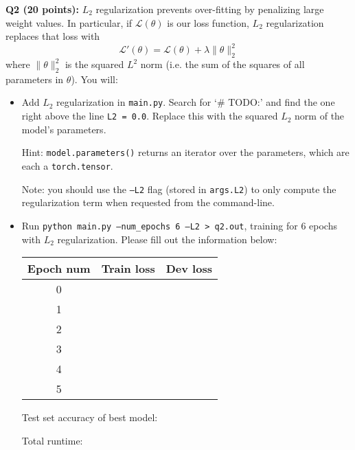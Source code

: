 \documentclass[11pt]{article}
\begin{document}
\vspace{0.4 in}
\noindent
{\bf Q2 (20 points):} $L_2$ regularization prevents over-fitting by penalizing large weight values.  In particular, if $\mathcal{L}(\theta)$ is our loss function, $L_2$ regularization replaces that loss with
\[ \mathcal{L}'(\theta) = \mathcal{L}(\theta) + \lambda \| \theta \|_2^2 \]
where $\|\theta\|_2^2$ is the squared $L^2$ norm (i.e. the sum of the squares of all parameters in $\theta$). You will:
\begin{itemize}
	\item Add $L_2$ regularization in \texttt{main.py}.  Search for `\# TODO:' and find the one right above the line \texttt{L2 = 0.0}.  Replace this with the squared $L_2$ norm of the model's parameters.

		Hint: \texttt{model.parameters()} returns an iterator over the parameters, which are each a \texttt{torch.tensor}.

		Note: you should use the \texttt{--L2} flag (stored in \texttt{args.L2}) to only compute the regularization term when requested from the command-line.
	\item Run \texttt{python main.py --num\_epochs 6 --L2 > q2.out}, training for 6 epochs with $L_2$ regularization.  Please fill out the information below:
		\begin{center}
		\begin{tabular}[h]{ccc}
			\toprule
			Epoch num & Train loss & Dev loss \\
			\midrule
			0 & & \\
			1 & & \\
			2 & & \\
			3 & & \\
			4 & & \\
			5 & & \\
			\bottomrule
		\end{tabular}
		\end{center}
		Test set accuracy of best model:

		Total runtime:
\end{itemize}
\end{document}
